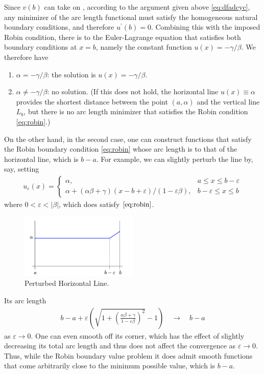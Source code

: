 \documentclass{article}
\begin{document}
\begin{exma}
Since $v(b)$ can take on , according to the argument given above \cref{eq:dfadcyc}, any minimizer of the arc length functional must satisfy the homogeneous natural boundary conditions, and therefore $u^{\prime}(b)=0$. Combining this with the imposed Robin condition, there is  to the Euler-Lagrange equation that satisfies both boundary conditions at $x=b$, namely the constant function $u(x)=-\gamma / \beta$. We therefore have
\begin{enumerate}
    \item $\alpha=-\gamma / \beta$: the solution is  $u(x)=-\gamma / \beta$.
    \item $\alpha\neq -\gamma / \beta$: no solution. (If this does not hold, the horizontal line $u(x) \equiv \alpha$ provides the shortest distance between the point $(a, \alpha)$ and the vertical line $L_{b}$, but there is no arc length minimizer that satisfies the Robin condition \cref{eq:robin}.)
\end{enumerate}

On the other hand, in the second case, one can construct functions that satisfy the Robin boundary condition \cref{eq:robin} whose arc length is  to that of the horizontal line, which is $b-a$. For example, we can slightly perturb the line by, say, setting
\begin{align*}
u_{\varepsilon}(x)= \begin{cases}\alpha, & a \leq x \leq b-\varepsilon \\ \alpha+(\alpha \beta+\gamma)(x-b+\varepsilon) /(1-\varepsilon \beta), & b-\varepsilon \leq x \leq b\end{cases}
\end{align*}
where $0<\varepsilon<|\beta|$, which does satisfy $\cref{eq:robin}$.
\begin{figure}[h]
    \centering
    \includegraphics[width=0.5\textwidth]{Figs/a8.png}
    \caption{Perturbed Horizontal Line.}
\end{figure}

Its arc length
\begin{align*}
b-a+\varepsilon\left(\sqrt{1+\left(\frac{\alpha \beta+\gamma}{1-\varepsilon \beta}\right)^{2}}-1\right) \quad \longrightarrow \quad b-a
\end{align*}
as $\varepsilon \rightarrow 0 .$ One can even smooth off its corner, which has the effect of slightly decreasing its total arc length and thus does not affect the convergence as $\varepsilon \rightarrow 0$. Thus, while the 
Robin boundary value problem  it does admit smooth functions that come arbitrarily close to the minimum possible value, which is $b-a$.
\end{exma} 
\end{document}
